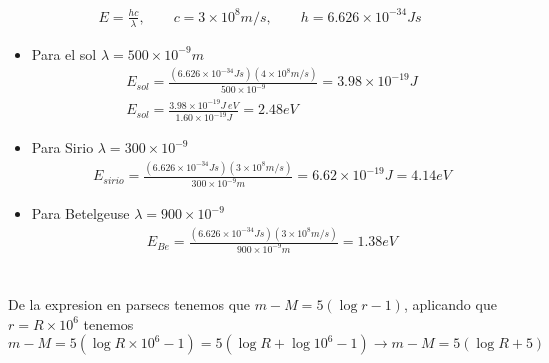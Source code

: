 \documentclass{article}
\begin{document}
\section{}
\begin{gather*}
  E = \frac{hc }{\lambda}, \qquad c = 3 \times10^{8} m/s, \qquad h = 6.626 \times10^{-34 }Js
\end{gather*}
\begin{itemize}
  \item Para el sol $ \lambda = 500 \times10^{-9 }m  $
    \begin{gather*}
      E _{sol } = \frac{(6.626 \times10^{-34 }Js )(4 \times10^{8 }m/s )}{500 \times10^{-9 }} = 3.98 \times10^{-19 }J \\
      E _{sol }  = \frac{3.98 \times10^{-19 }J\ eV }{1.60 \times10^{-19 }J } = 2.48 eV
    \end{gather*}

  \item Para Sirio $ \lambda = 300 \times10^{-9 } $ 
    \begin{gather*}
      E _{sirio } = \frac{(6.626 \times10^{-34 }Js)(3 \times10^{8 }m/s)}{300 \times10^{-9 }m  } = 6.62 \times10^{-19 }J = 4.14 eV 
    \end{gather*}

  \item Para Betelgeuse $ \lambda = 900 \times10^{-9 } $
    \begin{gather*}
      E _{Be } = \frac{(6.626 \times10^{-34 }Js ) (3 \times10^{8 } m/s ) }{900 \times10^{-9 }m } = 1.38 eV
    \end{gather*}
\end{itemize} 




\section{}
De la expresion en parsecs tenemos que $ m - M = 5(\log{r} - 1 ) $, aplicando que $ r = R \times10^{6 } $ tenemos $ m - M = 5(\log{R \times10^{6 }}- 1 ) = 5 (\log{R } + \log{10^6}- 1) \rightarrow m - M = 5(\log{R} + 5)$
\end{document}
